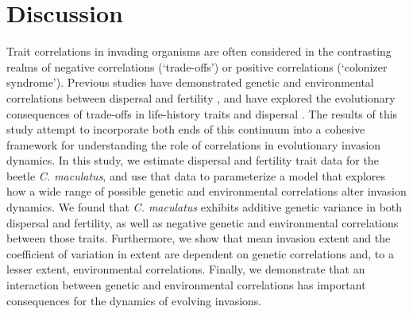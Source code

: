 \section{Discussion}

Trait correlations in invading organisms are often considered in the contrasting realms of negative correlations (`trade-offs') or positive correlations (`colonizer syndrome'). Previous studies have demonstrated genetic and environmental correlations between dispersal and fertility \citep{nur_consequences_1988,hughes_evolutionary_2003,hanski_dispersal-related_2006,karlsson_seasonal_2008,bonte_dispersal_2012,therry_higher_2014}, and have explored the evolutionary consequences of trade-offs in life-history traits and dispersal \citep{burton_trade-offs_2010,perkins_after_2016}. The results of this study attempt to incorporate both ends of this continuum into a cohesive framework for understanding the role of correlations in evolutionary invasion dynamics. In this study, we estimate dispersal and fertility trait data for the beetle \textit{C. maculatus}, and use that data to parameterize a model that explores how a wide range of possible genetic and environmental correlations alter invasion dynamics. We found that \textit{C. maculatus} exhibits additive genetic variance in both dispersal and fertility, as well as negative genetic and environmental correlations between those traits. Furthermore, we show that mean invasion extent and the coefficient of variation in extent are dependent on genetic correlations and, to a lesser extent, environmental correlations. Finally, we demonstrate that an interaction between genetic and environmental correlations has important consequences for the dynamics of evolving invasions. 

